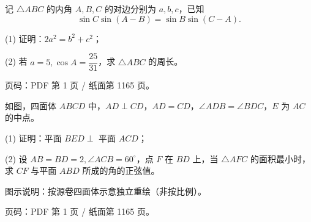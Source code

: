 \begin{question}
记 $\triangle ABC$ 的内角 $A,B,C$ 的对边分别为 $a,b,c$，已知
\nopagebreak[4]
\[
\sin C\sin(A-B)=\sin B\sin(C-A).
\]

  (1) 证明：$2a^2=b^2+c^2$；

  (2) 若 $a=5,\cos A=\dfrac{25}{31}$，求 $\triangle ABC$ 的周长。

\begin{gktip}
页码：PDF 第 1 页 / 纸面第 1165 页。
\end{gktip}

\Needspace{0.4\textheight}
\end{question}
\begin{question}
如图，四面体 $ABCD$ 中，$AD\perp CD$，$AD=CD$，$\angle ADB=\angle BDC$，$E$ 为 $AC$ 的中点。

  (1) 证明：平面 $BED\perp$ 平面 $ACD$；

  (2) 设 $AB=BD=2,\angle ACB=60^\circ$，点 $F$ 在 $BD$ 上，当 $\triangle AFC$ 的面积最小时，求 $CF$ 与平面 $ABD$ 所成的角的正弦值。

\begin{gktip}
图示说明：按源卷四面体示意独立重绘（非按比例）。
\end{gktip}
\nopagebreak[4]
\begin{center}\end{center}
\nopagebreak[4]
\begin{gktip}

页码：PDF 第 1 页 / 纸面第 1165 页。
\end{gktip}

\end{question}

